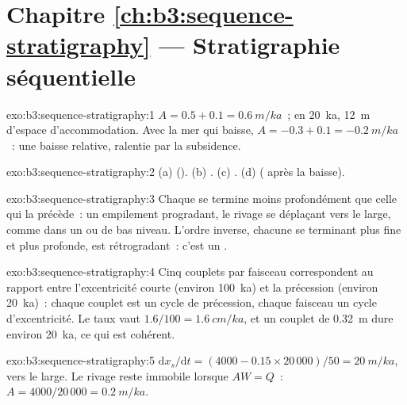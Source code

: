 \section*{Chapitre \ref{ch:b3:sequence-stratigraphy} --- Stratigraphie séquentielle}

\begin{solution}{exo:b3:sequence-stratigraphy:1}
$A = 0.5 + 0.1 = \qty{0.6}{m/ka}$~; en \qty{20}{ka}, \qty{12}{m} d'espace
d'accommodation. Avec la mer qui baisse, $A = -0.3 + 0.1 = \qty{-0.2}{m/ka}$~:
une baisse relative, ralentie par la subsidence.
\end{solution}

\begin{solution}{exo:b3:sequence-stratigraphy:2}
(a)  (). (b) . (c)
. (d)  ( après la baisse).
\end{solution}

\begin{solution}{exo:b3:sequence-stratigraphy:3}
Chaque  se termine moins profondément que celle qui la précède~: un
empilement progradant, le rivage se déplaçant vers le large, comme dans un
 ou de bas niveau. L'ordre inverse, chacune se terminant
plus fine et plus profonde, est rétrogradant~: c'est un .
\end{solution}

\begin{solution}{exo:b3:sequence-stratigraphy:4}
Cinq couplets par faisceau correspondent au rapport entre l'excentricité courte
(environ \qty{100}{ka}) et la précession (environ \qty{20}{ka})~: chaque
couplet est un cycle de précession, chaque faisceau un cycle d'excentricité. Le
taux vaut $1.6/100 = \qty{1.6}{cm/ka}$, et un couplet de \qty{0.32}{m} dure
environ \qty{20}{ka}, ce qui est cohérent.
\end{solution}

\begin{solution}{exo:b3:sequence-stratigraphy:5}
$\mathrm dx_s/\mathrm dt = (4000 - 0.15\times20\,000)/50 = \qty{20}{m/ka}$,
vers le large. Le rivage reste immobile lorsque $AW = Q$~: $A = 4000/20\,000 =
\qty{0.2}{m/ka}$.
\end{solution}

